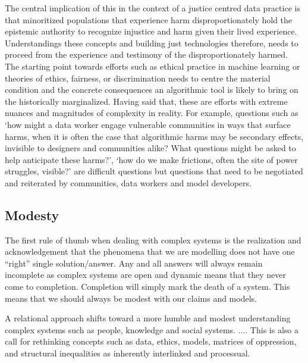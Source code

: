 
The central implication of this in the context of a justice centred data practice is that minoritized populations that experience harm disproportionately hold the epistemic authority to recognize injustice and harm given their lived experience. Understandings these concepts and building just technologies therefore, needs to proceed from the experience and testimony of the disproportionately harmed. The starting point towards efforts such as ethical practice in machine learning or theories of ethics, fairness, or discrimination needs to centre the material condition and the concrete consequences an algorithmic tool is likely to bring on the historically marginalized. Having said that, these are efforts with extreme nuances and magnitudes of complexity in reality. For example, questions such as `how might a data worker engage vulnerable communities in ways that surface harms, when it is often the case that algorithmic harms may be secondary effects, invisible to designers and communities alike? What questions might be asked to help anticipate these harms?', `how do we make frictions, often the site of power struggles, visible?' are difficult questions but questions that need to be negotiated and reiterated by communities, data workers and model developers. 




\subsection{Modesty}

The first rule of thumb when dealing with complex systems is the realization and acknowledgement that the phenomena that we are modelling does not have one “right” single solution/answer. Any and all answers will always remain incomplete as complex systems are open and dynamic means that they never come to completion. Completion will simply mark the death of a system. This means that we should always be modest with our claims and models. 


A relational approach shifts toward a more humble and modest understanding complex systems such as people, knowledge and social systems. .... This is also a call for rethinking concepts such as data, ethics, models, matrices of oppression, and structural inequalities as inherently interlinked and processual.   

